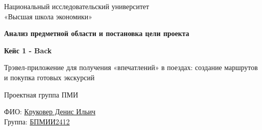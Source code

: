 \documentclass[a4paper]{article}
\begin{document}
\begin{titlepage}
\thispagestyle{empty}

\begin{center}
Национальный исследовательский университет\\
«Высшая школа экономики»

\vspace{3cm}

{\Large\bfseries Анализ предметной области и постановка цели проекта\par}

\vspace{1.5cm}

{\large\bfseries Кейс 1 - Back\par}

\vspace{0.75cm}

Трэвел-приложение для получения «впечатлений» в поездах: создание маршрутов и покупка готовых экскурсий

\vfill

Проектная группа ПМИ
\end{center}

\vspace{1.5cm}

\begin{flushright}
ФИО: \underline{Круковер Денис Ильич}\\[0.5cm]
Группа: \underline{БПМИИ2412}
\end{flushright}
\end{titlepage}
\end{document}

